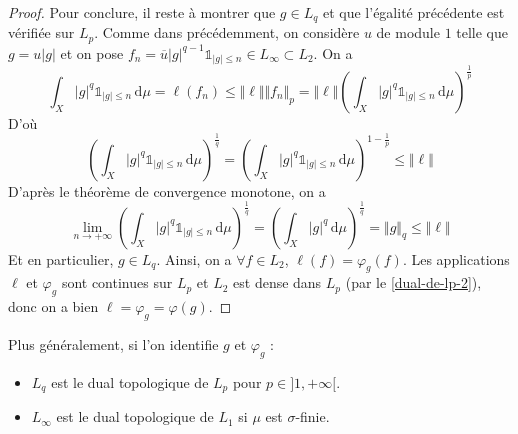 \begin{proof}
		Pour conclure, il reste à montrer que $g \in L_q$ et que l'égalité précédente est vérifiée sur $L_p$. Comme dans précédemment, on considère $u$ de module $1$ telle que $g = u \vert g \vert$ et on pose $f_n = \overline{u} \vert g \vert^{q-1} \mathbb{1}_{\vert g \vert \leq n} \in L_\infty \subset L_2$. On a
		\[ \int_X \vert g \vert^q \mathbb{1}_{\vert g \vert \leq n} \, \mathrm{d}\mu = \ell(f_n) \leq \Vert \ell \Vert \Vert f_n \Vert_p = \Vert \ell \Vert \left ( \int_X \vert g \vert^q \mathbb{1}_{\vert g \vert \leq n} \, \mathrm{d}\mu \right )^{\frac{1}{p}} \]
		D'où
		\[ \left ( \int_X \vert g \vert^q \mathbb{1}_{\vert g \vert \leq n} \, \mathrm{d}\mu \right )^{\frac{1}{q}} = \left ( \int_X \vert g \vert^q \mathbb{1}_{\vert g \vert \leq n} \, \mathrm{d}\mu \right )^{1 - \frac{1}{p}} \leq \Vert \ell \Vert \]
		D'après le théorème de convergence monotone, on a
		\[ \lim_{n \rightarrow +\infty} \left ( \int_X \vert g \vert^q \mathbb{1}_{\vert g \vert \leq n} \, \mathrm{d}\mu \right )^{\frac{1}{q}} = \left ( \int_X \vert g \vert^q \, \mathrm{d}\mu \right )^{\frac{1}{q}} = \Vert g \Vert_q \leq \Vert \ell \Vert \]
		Et en particulier, $g \in L_q$. Ainsi, on a $\forall f \in L_2$, $\ell(f) = \varphi_g(f)$. Les applications $\ell$ et $\varphi_g$ sont continues sur $L_p$ et $L_2$ est dense dans $L_p$ (par le \cref{dual-de-lp-2}), donc on a bien $\ell = \varphi_g = \varphi(g)$.
	\end{proof}


	\begin{remark}
		Plus généralement, si l'on identifie $g$ et $\varphi_g$ :
		\begin{itemize}
			\item $L_q$ est le dual topologique de $L_p$ pour $p \in ]1, +\infty[$.
			\item $L_\infty$ est le dual topologique de $L_1$ si $\mu$ est $\sigma$-finie.
		\end{itemize}
	\end{remark}

